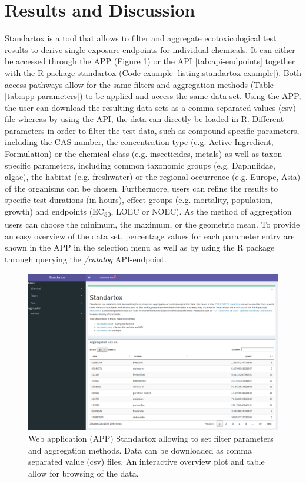 \section*{Results and Discussion}
Standartox is a tool that allows to filter and aggregate ecotoxicological test results to derive single exposure endpoints for individual chemicals. It can either be accessed through the APP (Figure \ref{fig:app}) or the API \ref{tab:api-endpoints} together with the R-package standartox (Code example \ref{listing:standartox-example}). Both access pathways allow for the same filters and aggregation methods (Table \ref{tab:app-parameters}) to be applied and access the same data set. Using the APP, the user can download the resulting data sets as a comma-separated values (csv) file whereas by using the API, the data can directly be loaded in R. Different parameters in order to filter the test data, such as compound-specific parameters, including the CAS number, the concentration type (e.g. Active Ingredient, Formulation) or the chemical class (e.g. insecticides, metals) as well as taxon-specific parameters, including common taxonomic groups (e.g. Daphniidae, algae), the habitat (e.g. freshwater) or the regional occurrence (e.g. Europe, Asia) of the organisms can be chosen. Furthermore, users can refine the results to specific test durations (in hours), effect groups (e.g. mortality, population, growth) and endpoints (EC\textsubscript{50}, LOEC or NOEC). As the method of aggregation users can choose the minimum, the maximum, or the geometric mean. To provide an easy overview of the data set, percentage values for each parameter entry are shown in the APP in the selection menu as well as by using the R package through querying the \textit{/catalog} API-endpoint.


\pagebreak
\begin{figure}
    \caption{Web application (APP) Standartox allowing to set filter parameters and aggregation methods. Data can be downloaded as comma separated value (csv) files. An interactive overview plot and table allow for browsing of the data.}
    \label{fig:app}
    \includegraphics[width=0.75\linewidth]{article/figures/screenshot_standartox_app.png}
\end{figure}


